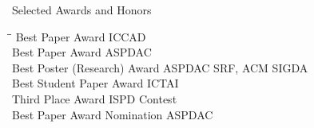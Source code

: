 
\begin{rSection}{Selected Awards and Honors}
\begin{tabbing}
\hspace{3.2in}\= \hspace{2.8in}\=\kill
    Best Paper Award                   \>ICCAD                         \\

    Best Paper Award                   \>ASPDAC                         \\

    Best Poster (Research) Award       \>ASPDAC SRF, ACM SIGDA        \\
    
    Best Student Paper Award           \>ICTAI                         \\

    Third Place Award                  \>ISPD Contest        \\

    Best Paper Award Nomination        \>ASPDAC                      

\end{tabbing}
\end{rSection}

